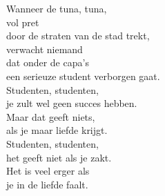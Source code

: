 \begin{translation}
Wanneer de tuna, tuna,\\
vol pret\\
door de straten van de stad trekt,\\
verwacht niemand\\
dat onder de capa's\\
een serieuze student verborgen gaat.\\
Studenten, studenten,\\
je zult wel geen succes hebben.\\
Maar dat geeft niets,\\
als je maar liefde krijgt.\\
Studenten, studenten,\\
het geeft niet als je zakt.\\
Het is veel erger als\\
je in de liefde faalt.\\
\end{translation}

